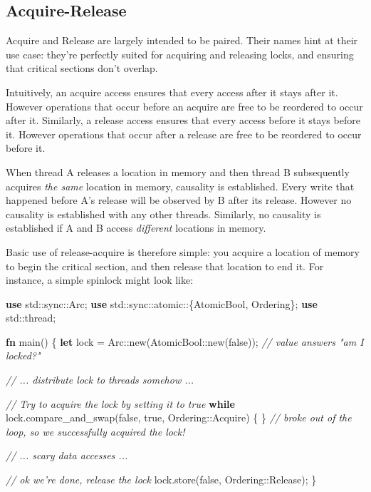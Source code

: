 \documentclass[a4paper,]{book}
\newenvironment{Shaded}{\begin{snugshade}}{\end{snugshade}}
\newcommand{\KeywordTok}[1]{\textcolor[rgb]{0.13,0.29,0.53}{\textbf{{#1}}}}
\newcommand{\ConstantTok}[1]{\textcolor[rgb]{0.00,0.00,0.00}{{#1}}}
\newcommand{\CommentTok}[1]{\textcolor[rgb]{0.56,0.35,0.01}{\textit{{#1}}}}
\newcommand{\NormalTok}[1]{{#1}}
\begin{document}
\subsection{Acquire-Release}\label{acquire-release}

Acquire and Release are largely intended to be paired. Their names hint
at their use case: they're perfectly suited for acquiring and releasing
locks, and ensuring that critical sections don't overlap.

Intuitively, an acquire access ensures that every access after it stays
after it. However operations that occur before an acquire are free to be
reordered to occur after it. Similarly, a release access ensures that
every access before it stays before it. However operations that occur
after a release are free to be reordered to occur before it.

When thread A releases a location in memory and then thread B
subsequently acquires \emph{the same} location in memory, causality is
established. Every write that happened before A's release will be
observed by B after its release. However no causality is established
with any other threads. Similarly, no causality is established if A and
B access \emph{different} locations in memory.

Basic use of release-acquire is therefore simple: you acquire a location
of memory to begin the critical section, and then release that location
to end it. For instance, a simple spinlock might look like:

\begin{Shaded}
\begin{Highlighting}[]
\KeywordTok{use} \NormalTok{std::sync::Arc;}
\KeywordTok{use} \NormalTok{std::sync::atomic::\{AtomicBool, Ordering\};}
\KeywordTok{use} \NormalTok{std::thread;}

\KeywordTok{fn} \NormalTok{main() \{}
    \KeywordTok{let} \NormalTok{lock = Arc::new(AtomicBool::new(}\ConstantTok{false}\NormalTok{)); }\CommentTok{// value answers "am I locked?"}

    \CommentTok{// ... distribute lock to threads somehow ...}

    \CommentTok{// Try to acquire the lock by setting it to true}
    \KeywordTok{while} \NormalTok{lock.compare_and_swap(}\ConstantTok{false}\NormalTok{, }\ConstantTok{true}\NormalTok{, Ordering::Acquire) \{ \}}
    \CommentTok{// broke out of the loop, so we successfully acquired the lock!}

    \CommentTok{// ... scary data accesses ...}

    \CommentTok{// ok we're done, release the lock}
    \NormalTok{lock.store(}\ConstantTok{false}\NormalTok{, Ordering::Release);}
\NormalTok{\}}
\end{Highlighting}
\end{Shaded}
\end{document}
